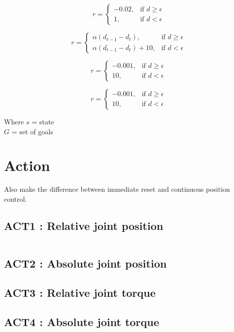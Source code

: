\documentclass{article}
\begin{document}
\begin{equation}
r = \begin{cases}
    - 0.02 , & \text{if $d \geq \epsilon $}\\
    1 , & \text{if $d < \epsilon $}
  \end{cases}
\end{equation}

\begin{equation}
r = \begin{cases}
\alpha (d_{t-1} - d_t), & \text{if $d \geq \epsilon $}\\
\alpha (d_{t-1} - d_t) + 10, & \text{if $d < \epsilon $}
  \end{cases}
\end{equation}

\begin{equation}
r = \begin{cases}
    - 0.001 , & \text{if $d \geq \epsilon $}\\
    10 , & \text{if $d < \epsilon $}
  \end{cases}
\end{equation}


\begin{equation}
r = \begin{cases}
    - 0.001 , & \text{if $d \geq \epsilon $}\\
    10 , & \text{if $d < \epsilon $}
  \end{cases}
\end{equation}

Where
$s$ = state \\
$G$ = set of goals \\


\section{Action}

Also make the difference between immediate reset and continuous position control.

\subsection*{ACT1 : Relative joint position}

\begin{equation}
[\delta_1, delta_2, delta_3, delta_4, delta_5, delta_6]
\end{equation}

\subsection*{ACT2 : Absolute joint position}

\subsection*{ACT3 : Relative joint torque}

\subsection*{ACT4 : Absolute joint torque}
\end{document}
